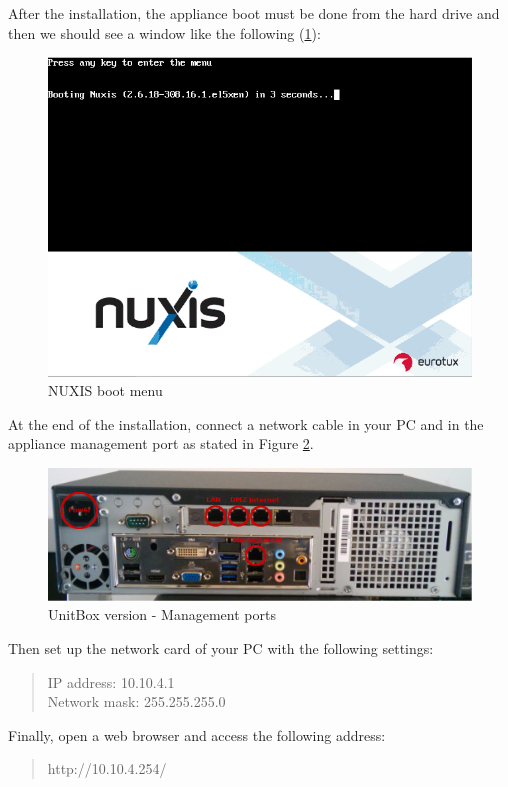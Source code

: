 After the installation, the appliance boot must be done from the hard drive and then we should see a window like the following (\ref{fig:boot_screen_standard}):

\begin{figure}[H]
	\begin{center}
	\includegraphics[scale=0.5]{screenshots/install_etva11.png}
	\caption{NUXIS boot menu}
	\label{fig:boot_screen_standard}
	\end{center}
\end{figure}

At the end of the installation, connect a network cable in your PC and in the appliance management port as stated in Figure \ref{fig:back_standard}.

\begin{figure}[H]
	\begin{center}
	\includegraphics[scale=0.30]{screenshots/appliance_back_g2.jpg}
	\caption{UnitBox version - Management ports}
	\label{fig:back_standard}
	\end{center}
\end{figure}

Then set up the network card of your PC with the following settings:

\begin{quote}
IP address: 10.10.4.1\\
Network mask: 255.255.255.0
\end{quote}

Finally, open a web browser and access the following address:
\begin{quote}
http://10.10.4.254/
\end{quote}

\pagebreak
